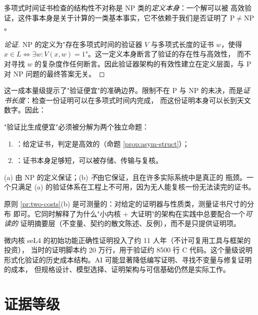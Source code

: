 \begin{proposition}[结构性不对称]\label{prop:asym-struct}
多项式时间证书检查的结构性不对称是 $\mathrm{NP}$ 类的\emph{定义本身}：一个解可以被
高效验证，这件事本身是关于计算的一类基本事实，它不依赖于我们是否证明了
$\mathrm{P} \neq \mathrm{NP}$。
\end{proposition}

\begin{proof}[论证]
$\mathrm{NP}$ 的定义为"存在多项式时间的验证器 $V$ 与多项式长度的证书 $w$，使得
$x \in L \iff \exists w: V(x,w) = 1$"。这一定义本身断言了验证的存在性与高效性，
而不对寻找 $w$ 的复杂度作任何断言。因此验证器架构的有效性建立在定义层面，与
$\mathrm{P}$ 对 $\mathrm{NP}$ 问题的最终答案无关。
\end{proof}

这一成本量级提示了"验证便宜"的准确边界。限制不在 $\mathrm{P}$ 与
$\mathrm{NP}$ 的未决，而是\emph{证书长度}：检查一份证明可以在多项式时间内完成，
而这份证明本身可以长到天文数字。因此：

\begin{principle}[验证成本的双分量]\label{pr:two-costs}
"验证比生成便宜"必须被分解为两个独立命题：
\begin{enumerate}[label=(\alph*)]
\item {}：给定证书，判定是高效的（命题 \ref{prop:asym-struct}）；
\item {}：证书本身足够短，可以被存储、传输与复核。
\end{enumerate}
(a) 由 $\mathrm{NP}$ 的定义保证；(b) \emph{不}由它保证，且在许多实际系统中是真正的
瓶颈。一个只满足 (a) 的验证体系在工程上不可用，因为无人能复核一份无法读完的证书。
\end{principle}

原则 \ref{pr:two-costs}(b) 是可测量的：对给定的证明器与性质类，测量证书尺寸的分布
即可。它同时解释了为什么"小内核 + 大证明"的架构在实践中总要配合一个\emph{可读的}
证明摘要层（不变量、契约的散文陈述、反例），而不是只提供证明项。

\begin{example}[形式化验证的历史成本量级]\label{ex:sel4-cost}
微内核 seL4 的初始功能正确性证明投入了约 11 人年（不计可复用工具与框架的投资），
当时的证明脚本约 20 万行，用于验证约 8500 行 C 代码\cite{klein2009}。这个量级说明
形式化验证的历史成本结构。AI 可能显著降低编写证明、寻找不变量与修复证明的成本，
但规格设计、模型选择、证明架构与可信基础仍然是实际工作。
\end{example}

\section{证据等级}\label{sec:evidence-levels}

